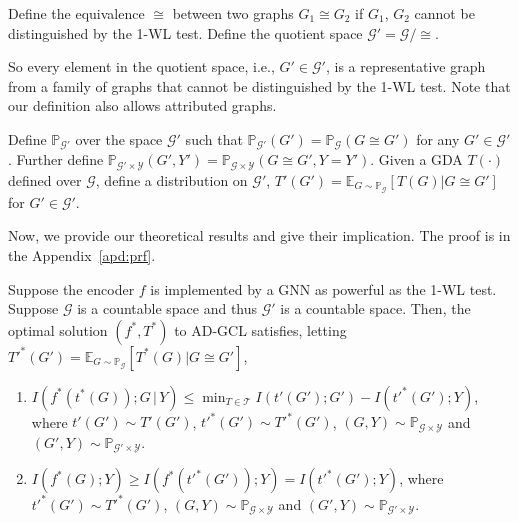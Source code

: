 \begin{definition}
Define the equivalence $\cong$ between two graphs $G_1\cong G_2$ if $G_1,\,G_2$ cannot be distinguished by the 1-WL test. Define the quotient space $\mathcal{G}' = \mathcal{G}/\cong$. %
\end{definition}\vspace{-1mm}
So every element in the quotient space, i.e., $G' \in \mathcal{G}'$, is a representative graph from a family of graphs that cannot be distinguished by the 1-WL test. Note that our definition also allows attributed graphs.
\begin{definition}
Define $\mathbb{P}_{\mathcal{G}'}$ over the space $\mathcal{G}'$ such that $\mathbb{P}_{\mathcal{G}'}(G') = \mathbb{P}_{\mathcal{G}}(G\cong G')$ for any $G'\in\mathcal{G}'$. Further define $\mathbb{P}_{\mathcal{G}'\times \mathcal{Y}} (G', Y') = \mathbb{P}_{\mathcal{G}\times \mathcal{Y}} (G\cong G', Y=Y')$. Given a GDA $T(\cdot)$ defined over $\mathcal{G}$, define a distribution on $\mathcal{G}'$, $T'(G') = \mathbb{E}_{G\sim \mathbb{P}_{\mathcal{G}}}[T(G)| G\cong G']$ for $G'\in \mathcal{G}'$. %
\end{definition}\vspace{-1mm}

Now, we provide our theoretical results and give their implication. The proof is in the Appendix~\ref{apd:prf}.
\begin{theorem} \label{thm:main}
Suppose the encoder $f$ is implemented by a GNN as powerful as the 1-WL test. Suppose $\mathcal{G}$ is a countable space and thus $\mathcal{G'}$ is a countable space. Then, the optimal solution $(f^*, T^*)$ to AD-GCL satisfies, letting $T'^{*}(G') = \mathbb{E}_{G\sim \mathbb{P}_{\mathcal{G}}}[T^*(G)| G\cong G']$, \vspace{-1mm}
\begin{enumerate}[leftmargin=*]
    \item $I(f^*(t^*(G)); G\,|\,Y) \leq  \min_{T\in\mathcal{T}} I(t'(G'); G') - I(t'^*(G'); Y) $, where $t'(G')\sim T'(G')$, $t'^*(G')\sim T'^{*}(G')$, $(G,Y)\sim \mathbb{P}_{\mathcal{G}\times \mathcal{Y}}$ and $(G',Y)\sim \mathbb{P}_{\mathcal{G}'\times \mathcal{Y}}$.
    \item $I(f^*(G); Y)\geq I(f^*(t'^*(G')); Y) = I(t'^*(G'); Y)$, where  $t'^*(G')\sim T'^*(G')$, $(G,Y)\sim \mathbb{P}_{\mathcal{G}\times \mathcal{Y}}$ and $(G',Y)\sim \mathbb{P}_{\mathcal{G}'\times \mathcal{Y}}$.
\end{enumerate}
\vspace{-1mm}
\end{theorem}

